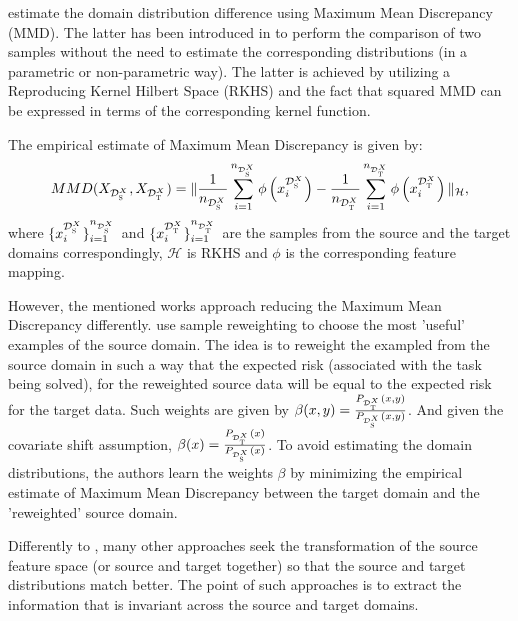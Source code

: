 
\citep{huang2007correcting, pan2008transfer, pan2011domain,baktashmotlagh2013unsupervised} estimate the domain distribution difference using Maximum Mean Discrepancy (MMD). The latter has been introduced in \citep{borgwardt2006integrating} to perform the comparison of two samples without the need to estimate the corresponding distributions (in a parametric or non-parametric way). The latter is achieved by utilizing a Reproducing Kernel Hilbert Space (RKHS) and the fact that squared MMD can be expressed in terms of the corresponding kernel function.

The empirical estimate of Maximum Mean Discrepancy is given by:
\begin{equation}
    \label{eq:MMD}
    MMD(X_\S, X_\T) = \| \frac{1}{n_{\S}} \sum_{i=1}^{n_{\S}} \phi \left(x^{\S}_i \right) - \frac{1}{n_{\T}} \sum_{i=1}^{n_{\T}} \phi \left(x^{\T}_i \right) \|_{\mathcal{H}},
\end{equation}
where $\{x^{\S}_i\}_{i=1}^{n_{\S}}$  and $\{x^{\T}_i\}_{i=1}^{n_{\T}}$ are the samples from the source and the target domains correspondingly, $\mathcal{H}$ is RKHS and $\phi$ is the corresponding feature mapping.

However, the mentioned works approach reducing the Maximum Mean Discrepancy differently.
\citep{huang2007correcting} use sample reweighting to choose the most 'useful' examples of the source domain. The idea is to reweight the exampled from the source domain in such a way that the expected risk (associated with the task being solved), for the reweighted source data will be equal to the expected risk for the target data. Such weights are given by $\beta(x,y) = \frac{ P_{\T}(x,y)}{P_{\S}(x,y)}$. And given the covariate shift assumption, $\beta(x) = \frac{ P_{\T}(x)}{P_{\S}(x)}$. To avoid estimating the domain distributions, the authors learn the weights $\beta$ by minimizing the empirical estimate of Maximum Mean Discrepancy between the target domain and the 'reweighted' source domain. 

Differently to \citep{huang2007correcting}, many other approaches seek the transformation of the source feature space (or source and target together) so that the source and target distributions match better. The point of such approaches is to extract the information that
is invariant across the source and target domains. 

